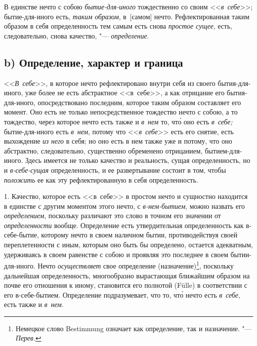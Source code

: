 В единстве нечто с собою {\em бытие-для-иного}
тождественно со своим <<{\em в~себе}>>; бытие-для-иного
есть, {\em таким образом}, в~[самом] нечто.
Рефлектированная таким образом в себя определенность тем самым есть снова
{\em простое сущее}, есть, следовательно, снова
качество, "--- {\em определение}.

\subsection[b) Определение, характер и граница]{b) Определение, характер и граница}

<<{\em В~себе}>>, в которое нечто рефлектировано внутри
себя из своего бытия-для-иного, уже более не есть абстрактное <<в~себе>>,
а как отрицание его бытия-для-иного, опосредствовано последним, которое
таким образом составляет его момент. Оно есть не только непосредственное
тождество нечто с собою, а то тождество, через которое нечто есть также и
{\em в~нем} то, чт\'{о} оно есть {\em в~себе;}
бытие-для-иного есть {\em в~нем}, потому что
<<{\em в~себе}>> есть его снятие, есть выхождение
{\em из него} в себя; но оно есть в нем также уже и
потому, что оно абстрактно, следовательно, существенно обременено
отрицанием, бытием-для-иного. Здесь имеется не только качество и
реальность, сущая определенность, но и
{\em в-себе-сущая} определенность, и ее развертывание
состоит в том, чтобы {\em положить} ее как эту
рефлектированную в себя определенность.

1. Качество, которое есть <<в~себе>>
в простом нечто и сущностно находится
в единстве с другим моментом этого нечто, с
{\em в-нем-бытием}, можно назвать его
{\em определением}, поскольку различают это слово в
точном его значении от {\em определенности} вообще.
Определение есть утвердительная определенность как в-себе-бытие, которому
нечто в своем наличном бытии, противодействуя своей переплетенности с
иным, которым оно быть бы определено, остается адекватным,
удерживаясь в своем равенстве с собою и проявляя это последнее в своем
бытии-для-иного. Нечто {\em осуществляет} свое
определение (назначение)\footnote{Немецкое слово Bestimmung
означает как определение, так и назначение. "--- {\em Перев.}},
поскольку дальнейшая определенность,
многообразно вырастающая ближайшим образом на почве его отношения к
иному, становится его полнотой (Fülle) в соответствии с его
в-себе-бытием. Определение подразумевает, что то, чт\'{о} нечто есть
{\em в~себе}, есть также и {\em в~нем}.

